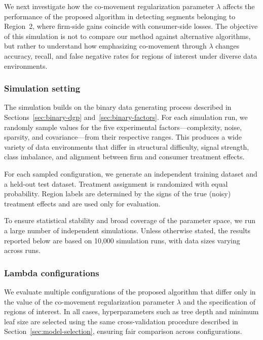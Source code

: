 \documentclass[11pt,letterpaper,english]{article}
\theoremstyle{definition}
\theoremstyle{definition}
\begin{document}
\begin{bibunit}
We next investigate how the co-movement regularization parameter $\lambda$ affects the performance of the proposed algorithm in detecting segments belonging to Region~2, where firm-side gains coincide with consumer-side losses. The objective of this simulation is not to compare our method against alternative algorithms, but rather to understand how emphasizing co-movement through $\lambda$ changes accuracy, recall, and false negative rates for regions of interest under diverse data environments.

\subsubsection{Simulation setting}

The simulation builds on the binary data generating process described in Sections~\ref{sec:binary-dgp} and~\ref{sec:binary-factors}. For each simulation run, we randomly sample values for the five experimental factors—complexity, noise, sparsity,  and covariance—from their respective ranges. This produces a wide variety of data environments that differ in structural difficulty, signal strength, class imbalance, and alignment between firm and consumer treatment effects.

For each sampled configuration, we generate an independent training dataset and a held-out test dataset. Treatment assignment is randomized with equal probability. Region labels are determined by the signs of the true (noisy) treatment effects and are used only for evaluation.

To ensure statistical stability and broad coverage of the parameter space, we run a large number of independent simulations. Unless otherwise stated, the results reported below are based on 10{,}000 simulation runs, with data sizes varying across runs.

\subsubsection{Lambda configurations}

We evaluate multiple configurations of the proposed algorithm that differ only in the value of the co-movement regularization parameter $\lambda$ and the specification of regions of interest. In all cases, hyperparameters such as tree depth and minimum leaf size are selected using the same cross-validation procedure described in Section~\ref{sec:model-selection}, ensuring fair comparison across configurations.


\end{bibunit}
\end{document}
